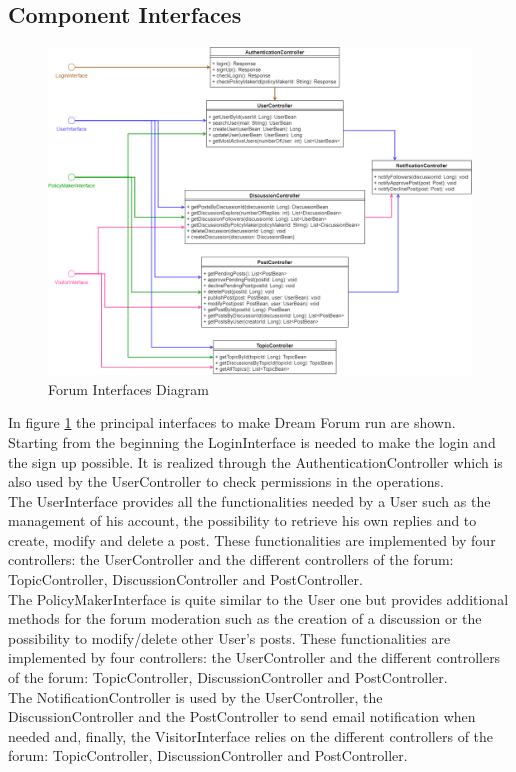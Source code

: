 \newpage
\subsection{Component Interfaces}

\begin{figure}[h!]
        \centering
        \includegraphics[scale=0.34]{images/component_interfaces/forum_component_interface.png}
        \caption{Forum Interfaces Diagram}
        \label{fig:forum_interfaces_diagram}
\end{figure}
\FloatBarrier

In figure \ref{fig:forum_interfaces_diagram} the principal interfaces to make Dream Forum run are shown.\\
Starting from the beginning the LoginInterface is needed to make the login and the sign up possible. It is realized through the AuthenticationController which is also used by the UserController to check permissions in the operations.\\
The UserInterface provides all the functionalities needed by a User such as the management of his account, the possibility to retrieve his own replies and to create, modify and delete a post. These functionalities are implemented by four controllers: the UserController and the different controllers of the forum: TopicController, DiscussionController and PostController.\\
The PolicyMakerInterface is quite similar to the User one but provides additional methods for the forum moderation such as the creation of a discussion or the possibility to modify/delete other User's posts. These functionalities are implemented by four controllers: the UserController and the different controllers of the forum: TopicController, DiscussionController and PostController.\\
The NotificationController is used by the UserController, the DiscussionController and the PostController to send email notification when needed and, finally, the VisitorInterface relies on the different controllers of the forum: TopicController, DiscussionController and PostController.

